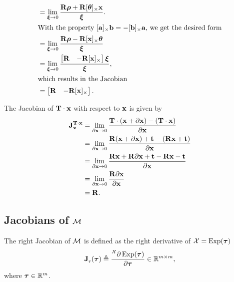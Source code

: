 \begin{example}[frametitle=Computing the Jacobians for $\matT \cdot \vecx$]
\begin{subequations}
\begin{align}
  &= \lim_{\vecxi \to 0} 
  \frac{\matR\vecrho + \matR\skewsymm{\vectheta}\vecx}{\vecxi}.\\
  \intertext{With the property $\skewsymm{\veca}\vecb = -\skewsymm{\vecb}\veca$, we get the desired form}
  &= \lim_{\vecxi \to 0} 
  \frac{\matR\vecrho - \matR\skewsymm{\vecx}\vectheta}{\vecxi}\\
  &= \lim_{\vecxi \to 0} 
  \frac{
  \begin{bmatrix}
    \matR & -\matR[\vecx]_\times
  \end{bmatrix}
  \vecxi}{\vecxi},\\
  \intertext{which results in the Jacobian}
  &= 
  \begin{bmatrix}
    \matR & -\matR[\vecx]_\times
  \end{bmatrix}.
\end{align}
\end{subequations}

The Jacobian of $\matT \cdot \vecx$ with respect to $\vecx$ is given by
\begin{subequations}
\begin{align}
  \jac{\matT \cdot \vecx}{\vecx} &= \lim_{\partial \vecx \to 0} 
  \frac{\matT \cdot (\vecx + \partial \vecx) - (\matT \cdot \vecx)}{\partial \vecx}\\
  &= \lim_{\partial \vecx \to 0} 
  \frac{\matR(\vecx + \partial \vecx) + \vect - (\matR\vecx + \vect)}{\partial \vecx}\\
  &= \lim_{\partial \vecx \to 0} 
  \frac{\matR\vecx + \matR\partial\vecx + \vect - \matR\vecx -\vect}{\partial \vecx}\\
  &= \lim_{\partial \vecx \to 0} 
  \frac{\matR\partial\vecx}{\partial \vecx}\\
  &= \matR.
\end{align}
\end{subequations}
\end{example}

\subsection{Jacobians of $\cM$}
The right Jacobian of $\cM$ is defined as the right derivative of $\cX = \Exp(\vectau)$
\begin{equation} \label{eq:right-jacobian}
  \jac{}{r}(\vectau) \triangleq \frac{\prescript{\cX}{}{\partial}\Exp(\vectau)}{\partial \vectau} \in \bbR^{m \times m},
\end{equation}
where $\vectau \in \bbR^m$.

